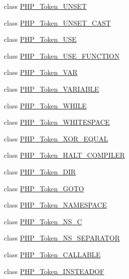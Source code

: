 \begin{DoxyCompactItemize}
\item 
class \mbox{\hyperlink{class_p_h_p___token___u_n_s_e_t}{P\+H\+P\+\_\+\+Token\+\_\+\+U\+N\+S\+ET}}
\item 
class \mbox{\hyperlink{class_p_h_p___token___u_n_s_e_t___c_a_s_t}{P\+H\+P\+\_\+\+Token\+\_\+\+U\+N\+S\+E\+T\+\_\+\+C\+A\+ST}}
\item 
class \mbox{\hyperlink{class_p_h_p___token___u_s_e}{P\+H\+P\+\_\+\+Token\+\_\+\+U\+SE}}
\item 
class \mbox{\hyperlink{class_p_h_p___token___u_s_e___f_u_n_c_t_i_o_n}{P\+H\+P\+\_\+\+Token\+\_\+\+U\+S\+E\+\_\+\+F\+U\+N\+C\+T\+I\+ON}}
\item 
class \mbox{\hyperlink{class_p_h_p___token___v_a_r}{P\+H\+P\+\_\+\+Token\+\_\+\+V\+AR}}
\item 
class \mbox{\hyperlink{class_p_h_p___token___v_a_r_i_a_b_l_e}{P\+H\+P\+\_\+\+Token\+\_\+\+V\+A\+R\+I\+A\+B\+LE}}
\item 
class \mbox{\hyperlink{class_p_h_p___token___w_h_i_l_e}{P\+H\+P\+\_\+\+Token\+\_\+\+W\+H\+I\+LE}}
\item 
class \mbox{\hyperlink{class_p_h_p___token___w_h_i_t_e_s_p_a_c_e}{P\+H\+P\+\_\+\+Token\+\_\+\+W\+H\+I\+T\+E\+S\+P\+A\+CE}}
\item 
class \mbox{\hyperlink{class_p_h_p___token___x_o_r___e_q_u_a_l}{P\+H\+P\+\_\+\+Token\+\_\+\+X\+O\+R\+\_\+\+E\+Q\+U\+AL}}
\item 
class \mbox{\hyperlink{class_p_h_p___token___h_a_l_t___c_o_m_p_i_l_e_r}{P\+H\+P\+\_\+\+Token\+\_\+\+H\+A\+L\+T\+\_\+\+C\+O\+M\+P\+I\+L\+ER}}
\item 
class \mbox{\hyperlink{class_p_h_p___token___d_i_r}{P\+H\+P\+\_\+\+Token\+\_\+\+D\+IR}}
\item 
class \mbox{\hyperlink{class_p_h_p___token___g_o_t_o}{P\+H\+P\+\_\+\+Token\+\_\+\+G\+O\+TO}}
\item 
class \mbox{\hyperlink{class_p_h_p___token___n_a_m_e_s_p_a_c_e}{P\+H\+P\+\_\+\+Token\+\_\+\+N\+A\+M\+E\+S\+P\+A\+CE}}
\item 
class \mbox{\hyperlink{class_p_h_p___token___n_s___c}{P\+H\+P\+\_\+\+Token\+\_\+\+N\+S\+\_\+C}}
\item 
class \mbox{\hyperlink{class_p_h_p___token___n_s___s_e_p_a_r_a_t_o_r}{P\+H\+P\+\_\+\+Token\+\_\+\+N\+S\+\_\+\+S\+E\+P\+A\+R\+A\+T\+OR}}
\item 
class \mbox{\hyperlink{class_p_h_p___token___c_a_l_l_a_b_l_e}{P\+H\+P\+\_\+\+Token\+\_\+\+C\+A\+L\+L\+A\+B\+LE}}
\item 
class \mbox{\hyperlink{class_p_h_p___token___i_n_s_t_e_a_d_o_f}{P\+H\+P\+\_\+\+Token\+\_\+\+I\+N\+S\+T\+E\+A\+D\+OF}}

\end{DoxyCompactItemize}
